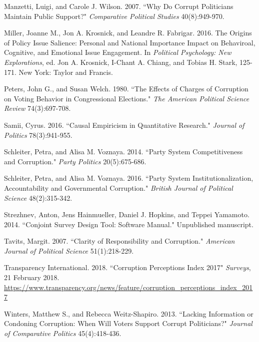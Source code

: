 \documentclass[11pt]{article}
\begin{document}
\begin{thebibliography}{56}
Manzetti, Luigi, and Carole J. Wilson. 2007. “Why Do Corrupt Politicians Maintain Public Support?" \textit{Comparative Political Studies} 40(8):949-970.

Miller, Joanne M., Jon A. Krosnick, and Leandre R. Fabrigar. 2016. The Origins of Policy Issue Salience: Personal and National Importance Impact on Behaviroal, Cognitive, and Emotional Issue Engagement. In \textit{Political Psychology: New Explorations}, ed. Jon A. Krosnick, I-Chant A. Chiang, and Tobias H. Stark, 125-171. New York: Taylor and Francis.

Peters, John G., and Susan Welch. 1980. “The Effects of Charges of Corruption on Voting Behavior in Congressional Elections." \textit{The American Political Science Review} 74(3):697-708.

Samii, Cyrus. 2016. “Causal Empiricism in Quantitative Research." \textit{Journal of Politics} 78(3):941-955.

Schleiter, Petra, and Alisa M. Voznaya. 2014. “Party System Competitiveness and Corruption." \textit{Party Politics} 20(5):675-686.

Schleiter, Petra, and Alisa M. Voznaya. 2016. “Party System Institutionalization, Accountability and Governmental Corruption." \textit{British Journal of Political Science} 48(2):315-342.

Strezhnev, Anton, Jens Hainmueller, Daniel J. Hopkins, and Teppei Yamamoto. 2014. “Conjoint Survey Design Tool: Software Manual." Unpublished manuscript.

Tavits, Margit. 2007. “Clarity of Responsibility and Corruption." \textit{American Journal of Political Science} 51(1):218-229.

Transparency International. 2018. “Corruption Perceptions Index 2017" \textit{Surveys}, 21 February 2018. \url{https://www.transparency.org/news/feature/corruption_perceptions_index_2017}

Winters, Matthew S., and Rebecca Weitz-Shapiro. 2013. “Lacking Information or Condoning Corruption: When Will Voters Support Corrupt Politicians?" \textit{Journal of Comparative Politics} 45(4):418-436.

\end{thebibliography}
\end{document}
